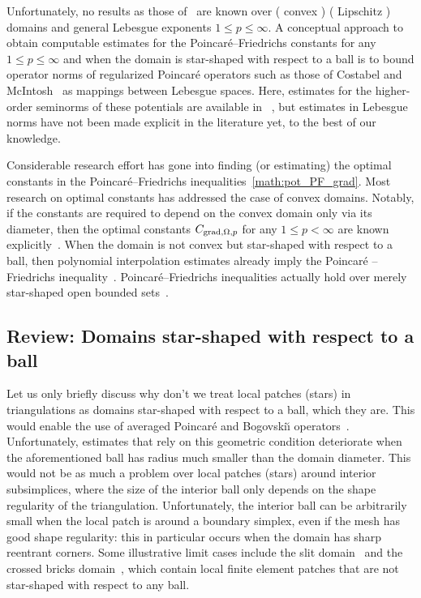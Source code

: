 \documentclass[10pt,a4paper]{article}
\newcommand\cye[1]{%
\protect\leavevmode
\begingroup
    \color{blue}%
    #1%
\endgroup
}
\begin{document}
Unfortunately, no results as those of~\cite{guerini2004eigenvalue, Paul_Vald_PF_grad_curl_div_20} are known over \cye{(}convex\cye{)} \cye{(}Lipschitz\cye{)} domains and general Lebesgue exponents $1 \leq p \leq \infty$. 
\cye{A conceptual approach to obtain computable} estimates for the Poincar\'e--Friedrichs constants \cye{for any $1 \leq p \leq \infty$} and when the domain is star-shaped with respect to a ball is to bound operator norms of regularized Poincar\'e operators \cye{such as those of} Costabel and McIntosh~\cite{costabel2010bogovskiui} as mappings between Lebesgue spaces. 
Here, estimates for the higher-order seminorms of these potentials \cye{are available in}~\cite{guzman2021estimation}, but estimates in Lebesgue norms have not been made explicit in the literature yet, to the best of our knowledge.

Considerable research effort has gone into finding (or estimating) the optimal constants in the Poincar\'e--Friedrichs inequalities~\eqref{math:pot_PF_grad}. Most research on optimal constants has addressed the case of convex domains. 
Notably, if the constants are required to depend on the convex domain only via its diameter, 
then the optimal constants $C_{\operatorname{grad},\Omega,p}$ for any $1 \leq p < \infty$ are known explicitly~\cite{Pay_Wei_Poin_conv_60,bebendorf2003note,acosta2004optimal,esposito2013poincare,ferone2012remark}.
When the domain is not convex but star-shaped with respect to a ball,
then polynomial interpolation estimates already imply the Poincar\'e\cye{--Friedrichs} inequality~\cite{brenner2008mathematical,ern2021finite}. 
Poincar\'e--Friedrichs inequalities actually hold over merely star-shaped open bounded sets~\cite[Theorem~3.1]{hurri1988poincare}. 


\subsection{Review: Domains star-shaped with respect to a ball}

\cye{Let us only briefly discuss why don't we treat local \cye{patches} (stars) in triangulations as} domains star-shaped with respect to a ball, which they are. This \cye{would enable} the use of averaged Poincar\'e and Bogovski\u{\i} operators~\cite{costabel2010bogovskiui}. Unfortunately, estimates that rely on this geometric condition deteriorate when the aforementioned ball has radius much smaller than the domain diameter. 
This \cye{would not be} as much a problem over local patches (stars) around interior subsimplices, where the size of the interior ball only depends on the shape regularity of the triangulation. 
\cye{Unfortunately,} the interior ball can be arbitrarily small when the local patch is around a boundary simplex, even if the mesh has good shape regularity: 
this \cye{in particular} occurs when the domain has sharp reentrant corners. Some illustrative limit cases include the slit domain~\cite{veeser2012poincare} and the crossed bricks domain~\cite{licht2019smoothed}, 
which contain local finite element patches \cye{that} are not star-shaped with respect to any ball. 
\\
\end{document}
